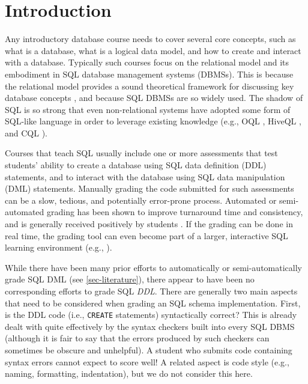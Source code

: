 \documentclass[sigconf, authordraft, capitalise]{acmart}
\begin{document}

\maketitle


\section{Introduction}

Any introductory database course needs to cover several core concepts, such as what is a database, what is a logical data model, and how to create and interact with a database. Typically such courses focus on the relational model and its embodiment in SQL database management systems (DBMSs). This is because the relational model provides a sound theoretical framework for discussing key database concepts \cite{Date.C-2009a-SQL-and-Relational}, and because SQL DBMSs are so widely used. The shadow of SQL is so strong that even non-relational systems have adopted some form of SQL-like language in order to leverage existing knowledge (e.g., OQL \cite{Cattell.R-2000a-ODMG3}, HiveQL \cite{Apache-2017a-Hive}, and CQL \cite{Apache-2017a-CQL}).

Courses that teach SQL usually include one or more assessments that test students' ability to create a database using SQL data definition (DDL) statements, and to interact with the database using SQL data manipulation (DML) statements. Manually grading the code submitted for such assessments can be a slow, tedious, and potentially error-prone process. Automated or semi-automated grading has been shown to improve turnaround time and consistency, and is generally received positively by students \cite{Douce.C-2005a-Automatic,Russell.G-2004a-Improving,Dekeyser.S-2007a-Computer,Prior.J-2004a-Backwash}. If the grading can be done in real time, the grading tool can even become part of a larger, interactive SQL learning environment (e.g.,  \cite{Kenny.C-2005a-Automated,Kleiner.C-2013a-Automated,Mitrovic.A-1998a-Learning,Russell.G-2004a-Improving,Sadiq.S-2004a-SQLator}).

While there have been many prior efforts to automatically or semi-automatically grade SQL DML (see \cref{sec-literature}), there appear to have been no corresponding efforts to grade SQL \emph{DDL}. There are generally two main aspects that need to be considered when grading an SQL schema implementation. First, is the DDL code (i.e., \texttt{CREATE} statements) syntactically correct? This is already dealt with quite effectively by the syntax checkers built into every SQL DBMS (although it is fair to say that the errors produced by such checkers can sometimes be obscure and unhelpful). A student who submits code containing syntax errors cannot expect to score well! A related aspect is code style (e.g., naming, formatting, indentation), but we do not consider this here.
    
\end{document}
